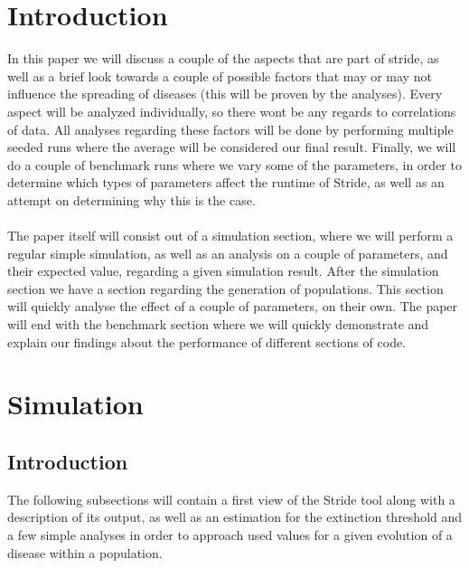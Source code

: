 \documentclass[runningheads]{llncs}
\begin{document}
	\section{Introduction}
	In this paper we will discuss a couple of the aspects that are part of stride, as well as a brief look towards a couple of possible factors that may or may not influence the spreading of diseases (this will be proven by the analyses). Every aspect will be analyzed individually, so there wont be any regards to correlations of data. All analyses regarding these factors will be done by performing multiple seeded runs where the average will be considered our final result. Finally, we will do a couple of benchmark runs where we vary some of the parameters, in order to determine which types of parameters affect the runtime of Stride, as well as an attempt on determining why this is the case. \\
	\\
	The paper itself will consist out of a simulation section, where we will perform a regular simple simulation, as well as an analysis on a couple of parameters, and their expected value, regarding a given simulation result. After the simulation section we have a section regarding the generation of populations. This section will quickly analyse the effect of a couple of parameters, on their own. The paper will end with the benchmark section where we will quickly demonstrate and explain our findings about the performance of different sections of code.
	
	\section{Simulation}
	
	\subsection{Introduction}
	The following subsections will contain a first view of the Stride tool along with a description of its output, as well as an estimation for the extinction threshold and a few simple analyses in order to approach used values for a given evolution of a disease within a population.
	
\end{document}
